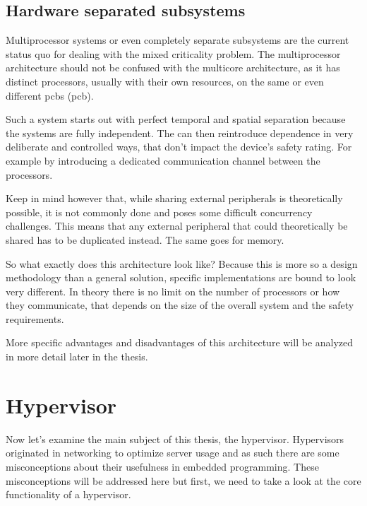 \subsection{Hardware separated subsystems \label{HSS}}
Multiprocessor systems or even completely separate subsystems are the current status quo for dealing with the mixed criticality problem. The multiprocessor architecture should not be confused with the multicore architecture, as it has distinct processors, usually with their own resources, on the same or even different \acrlong{pcb}s (\acrshort{pcb}).

Such a system starts out with perfect temporal and spatial separation because the systems are fully independent. The \mfg{} can then reintroduce dependence in very deliberate and controlled ways, that don't impact the device's safety rating. For example by introducing a dedicated communication channel between the processors. 

Keep in mind however that, while sharing external peripherals is theoretically possible, it is not commonly done and poses some difficult concurrency challenges. This means that any external peripheral that could theoretically be shared has to be duplicated instead. The same goes for memory.

So what exactly does this architecture look like? Because this is more so a design methodology than a general solution, specific implementations are bound to look very different. In theory there is no limit on the number of processors or how they communicate, that depends on the size of the overall system and the safety requirements. 

More specific advantages and disadvantages of this architecture will be analyzed in more detail later in the thesis.

\section{Hypervisor}
Now let’s examine the main subject of this thesis, the hypervisor. Hypervisors originated in networking to optimize server usage and as such there are some misconceptions about their usefulness in embedded programming. These misconceptions will be addressed here but first, we need to take a look at the core functionality of a hypervisor.

